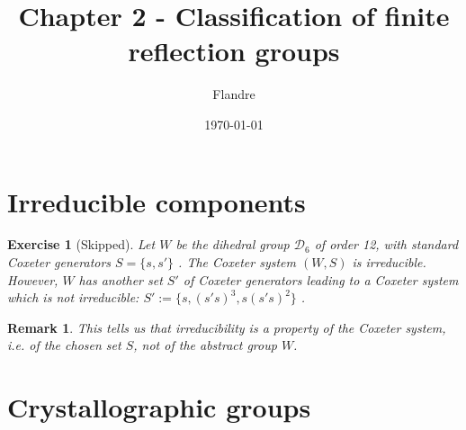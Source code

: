 \documentclass{article}
\title{Chapter 2 - Classification of finite reflection groups}
\author{Flandre}
\date{\today}
\theoremstyle{breakstyle}
\newtheorem{exercise}{Exercise}[section]
\newtheorem{remark}{Remark}[section]
\begin{document}
\maketitle

\setcounter{section}{1}
\section{Irreducible components}

\begin{exercise}[Skipped]
Let $W$ be the dihedral group $\mathcal{D}_6$ of order 12, with standard Coxeter
generators $S = \{s, s'\}$ . The Coxeter system $(W, S)$ is irreducible.
However, $W$ has another set $S'$ of Coxeter generators leading to a Coxeter
system which is not irreducible: $S' := \{s, (s's)^3, s(s's)^2\}$ .
\end{exercise}

\begin{remark}
    This tells us that irreducibility is a property of the Coxeter system, i.e.
    of the chosen set $S$, not of the abstract group $W$.
\end{remark}

\setcounter{section}{7}
\section{Crystallographic groups}
\end{document}
